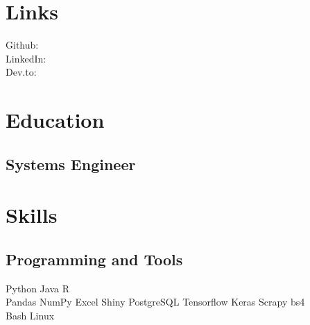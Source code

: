 \documentclass[]{deedy-resume-openfont}
\begin{document}
%
%



%
%

\begin{minipage}[t]{0.33\textwidth} 


\section{Links} 
Github: \href{https://github.com/JCatrielLopez}{} \\
LinkedIn: \href{https://www.linkedin.com/in/JCatrielLopez/}{} \\
Dev.to: \href{https://dev.to/catriel}{} \\
\sectionsep


\section{Education} 

\subsection{Systems Engineer}

%
%
\sectionsep



\section{Skills}
\subsection{Programming and Tools}
Python \textbullet{}   Java \textbullet{}  R \\
Pandas \textbullet{} NumPy \textbullet{} Excel \textbullet{} 
Shiny \textbullet{} PostgreSQL \textbullet{} Tensorflow \textbullet{} Keras \textbullet{} Scrapy \textbullet{} bs4 \\
Bash \textbullet{} Linux
\sectionsep


\end{minipage}
\end{document}
